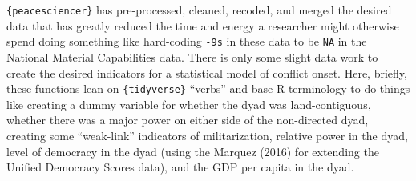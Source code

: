 \documentclass[
  11pt,
]{article}
\begin{document}
\texttt{\{peacesciencer\}} has pre-processed, cleaned, recoded, and merged the desired data that has greatly reduced the time and energy a researcher might otherwise spend doing something like hard-coding \texttt{-9s} in these data to be \texttt{NA} in the National Material Capabilities data. There is only some slight data work to create the desired indicators for a statistical model of conflict onset. Here, briefly, these functions lean on \texttt{\{tidyverse\}} ``verbs'' and base R terminology to do things like creating a dummy variable for whether the dyad was land-contiguous, whether there was a major power on either side of the non-directed dyad, creating some ``weak-link'' indicators of militarization, relative power in the dyad, level of democracy in the dyad (using the Marquez (2016) for extending the Unified Democracy Scores data), and the GDP per capita in the dyad.
\end{document}
